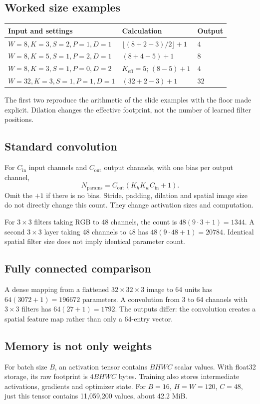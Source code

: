 \documentclass[11pt]{article}
\begin{document}
\subsection{Worked size examples}
\begin{longtable}{@{}P{.31\textwidth}P{.34\textwidth}P{.26\textwidth}@{}}
\toprule Input and settings & Calculation & Output\\\midrule\endhead
$W=8,K=3,S=2,P=1,D=1$ & $\lfloor(8+2-3)/2\rfloor+1$ & $4$\\
$W=8,K=5,S=1,P=2,D=1$ & $(8+4-5)+1$ & $8$\\
$W=8,K=3,S=1,P=0,D=2$ & $K_{\mathrm{eff}}=5$; $(8-5)+1$ & $4$\\
$W=32,K=3,S=1,P=1,D=1$ & $(32+2-3)+1$ & $32$\\\bottomrule
\end{longtable}
The first two reproduce the arithmetic of the slide examples with the floor made explicit. Dilation changes the effective footprint, not the number of learned filter positions.
\subsection{Standard convolution}
For $C_{\mathrm{in}}$ input channels and $C_{\mathrm{out}}$ output channels, with one bias per output channel,
\[
N_{\mathrm{params}}=C_{\mathrm{out}}(K_hK_wC_{\mathrm{in}}+1).
\]
Omit the $+1$ if there is no bias. Stride, padding, dilation and spatial image size do not directly change this count. They change activation sizes and computation.

For $3\times3$ filters taking RGB to 48 channels, the count is $48(9\cdot3+1)=1344$. A second $3\times3$ layer taking 48 channels to 48 has $48(9\cdot48+1)=20784$. Identical spatial filter size does not imply identical parameter count.
\subsection{Fully connected comparison}
A dense mapping from a flattened $32\times32\times3$ image to 64 units has $64(3072+1)=196672$ parameters. A convolution from 3 to 64 channels with $3\times3$ filters has $64(27+1)=1792$. The outputs differ: the convolution creates a spatial feature map rather than only a 64-entry vector.
\subsection{Memory is not only weights}
For batch size $B$, an activation tensor contains $BHWC$ scalar values. With float32 storage, its raw footprint is $4BHWC$ bytes. Training also stores intermediate activations, gradients and optimizer state. For $B=16$, $H=W=120$, $C=48$, just this tensor contains 11,059,200 values, about 42.2 MiB.
\end{document}
